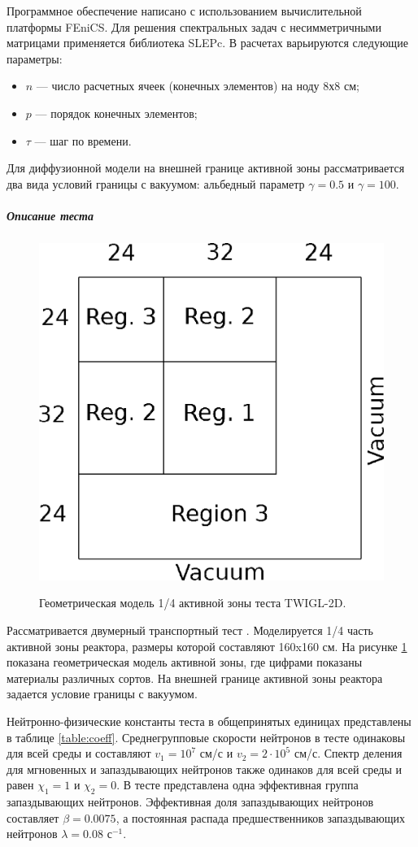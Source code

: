 \documentclass{crm-article}
\begin{document}
Программное обеспечение написано с использованием вычислительной платформы FEniCS. 
Для решения спектральных задач с несимметричными матрицами применяется библиотека SLEPc. 
В расчетах варьируются следующие параметры:
\begin{itemize}\itemsep1pt \parskip0pt 
\item $n$ --- число расчетных ячеек (конечных элементов) на ноду 8х8 см; 
\item $p$ --- порядок конечных элементов;
\item $\tau$ --- шаг по времени.
\end{itemize}
Для диффузионной модели на внешней границе активной зоны рассматривается два вида условий границы с вакуумом: альбедный параметр $\gamma=0.5$ и $\gamma=100$.

\subparagraph{Описание теста}
\begin{figure}[ht]
\begin{center}
	\includegraphics[width=0.4\linewidth]{twigl.eps}\\
	\caption{\label{image:canonsummary}Геометрическая модель 1/4 активной зоны теста TWIGL-2D.}
	\label{ris:twigl}
\end{center}
\end{figure}

Рассматривается двумерный транспортный тест \cite{hageman1969}. 
Моделируется 1/4 часть активной зоны реактора, размеры которой составляют 160x160 см.
На рисунке \ref{ris:twigl} показана геометрическая модель активной зоны, где цифрами показаны материалы различных сортов.
На внешней границе активной зоны реактора задается условие границы с вакуумом.  

Нейтронно-физические константы теста в общепринятых единицах представлены в таблице \ref{table:coeff}. 
Среднегрупповые скорости нейтронов в тесте одинаковы для всей среды и составляют $v_1 = 10^7$ см/с и $v_2 = 2 \cdot 10^5$ см/с. 
Спектр деления для мгновенных и запаздывающих нейтронов также одинаков для всей среды и равен $\chi_1 = 1$ и $\chi_2 = 0$.
В тесте представлена одна эффективная группа запаздывающих нейтронов. 
Эффективная доля запаздывающих нейтронов составляет $\beta = 0.0075$, а постоянная распада предшественников запаздывающих нейтронов $\lambda = 0.08$ с$^{-1}$. 
\end{document}
